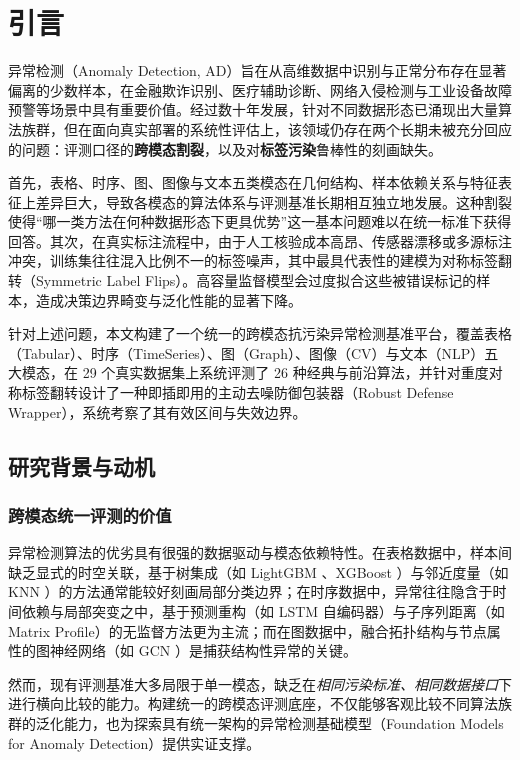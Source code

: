 \chapter{引言}\label{chap:introduction}

异常检测（Anomaly Detection, AD）旨在从高维数据中识别与正常分布存在显著偏离的少数样本，在金融欺诈识别、医疗辅助诊断、网络入侵检测与工业设备故障预警等场景中具有重要价值。经过数十年发展，针对不同数据形态已涌现出大量算法族群，但在面向真实部署的系统性评估上，该领域仍存在两个长期未被充分回应的问题：评测口径的\textbf{跨模态割裂}，以及对\textbf{标签污染}鲁棒性的刻画缺失。

首先，表格、时序、图、图像与文本五类模态在几何结构、样本依赖关系与特征表征上差异巨大，导致各模态的算法体系与评测基准长期相互独立地发展。这种割裂使得“哪一类方法在何种数据形态下更具优势”这一基本问题难以在统一标准下获得回答。其次，在真实标注流程中，由于人工核验成本高昂、传感器漂移或多源标注冲突，训练集往往混入比例不一的标签噪声，其中最具代表性的建模为对称标签翻转（Symmetric Label Flips）\cite{frenay2013labelnoise}。高容量监督模型会过度拟合这些被错误标记的样本，造成决策边界畸变与泛化性能的显著下降。

针对上述问题，本文构建了一个统一的跨模态抗污染异常检测基准平台，覆盖表格（Tabular）、时序（Time\-Series）、图（Graph）、图像（CV）与文本（NLP）五大模态，在 29 个真实数据集上系统评测了 26 种经典与前沿算法，并针对重度对称标签翻转设计了一种即插即用的主动去噪防御包装器（Robust Defense Wrapper），系统考察了其有效区间与失效边界。

\section{研究背景与动机}

\subsection{跨模态统一评测的价值}
异常检测算法的优劣具有很强的数据驱动与模态依赖特性。在表格数据中，样本间缺乏显式的时空关联，基于树集成（如 LightGBM \cite{ke2017lightgbm}、XGBoost \cite{chen2016xgboost}）与邻近度量（如 KNN \cite{zhao2019pyod}）的方法通常能较好刻画局部分类边界；在时序数据中，异常往往隐含于时间依赖与局部突变之中，基于预测重构（如 LSTM 自编码器）与子序列距离（如 Matrix Profile）的无监督方法更为主流；而在图数据中，融合拓扑结构与节点属性的图神经网络（如 GCN \cite{gadbench2024}）是捕获结构性异常的关键。

然而，现有评测基准大多局限于单一模态，缺乏在\emph{相同污染标准、相同数据接口}下进行横向比较的能力。构建统一的跨模态评测底座，不仅能够客观比较不同算法族群的泛化能力，也为探索具有统一架构的异常检测基础模型（Foundation Models for Anomaly Detection）提供实证支撑。

